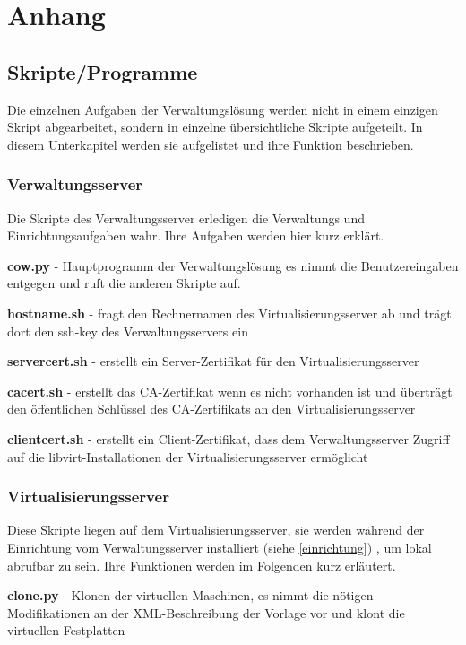 \chapter{Anhang} 
\section{Skripte/Programme}
Die einzelnen Aufgaben der Verwaltungslösung werden nicht in einem einzigen Skript abgearbeitet, sondern in einzelne übersichtliche Skripte aufgeteilt. In diesem Unterkapitel werden sie aufgelistet und ihre Funktion beschrieben.

\subsection{Verwaltungsserver}
Die Skripte des Verwaltungsserver erledigen die Verwaltungs und Einrichtungsaufgaben wahr. Ihre Aufgaben werden hier kurz erklärt.

\textbf{cow.py}
- Hauptprogramm der Verwaltungslösung es nimmt die Benutzereingaben entgegen und ruft die anderen Skripte auf.

\textbf{hostname.sh} 
- fragt den Rechnernamen des Virtualisierungsserver ab und trägt dort den ssh-key des Verwaltungsservers ein 

\textbf{servercert.sh}
- erstellt ein Server-Zertifikat für den Virtualisierungsserver

\textbf{cacert.sh}
- erstellt das CA-Zertifikat wenn es nicht vorhanden ist und überträgt den öffentlichen Schlüssel des CA-Zertifikats an den Virtualisierungsserver 

\textbf{clientcert.sh}
- erstellt ein Client-Zertifikat, dass dem Verwaltungsserver Zugriff auf die libvirt-Installationen der Virtualisierungsserver ermöglicht

\subsection{Virtualisierungsserver}
Diese Skripte liegen auf dem Virtualisierungsserver, sie werden während der Einrichtung vom Verwaltungsserver installiert (siehe \ref{einrichtung}) , um lokal abrufbar zu sein. Ihre Funktionen werden im Folgenden kurz erläutert.

\textbf{clone.py}
- Klonen der virtuellen Maschinen, es nimmt die nötigen Modifikationen an der XML-Beschreibung der Vorlage vor und klont die virtuellen Festplatten


